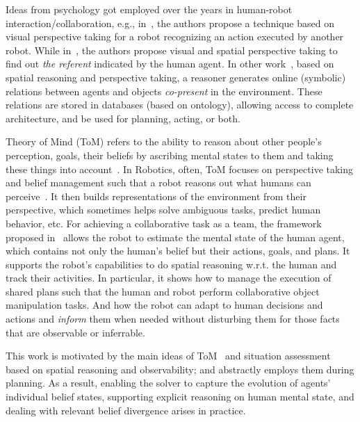 \documentclass[letterpaper]{article} %
\begin{document}
Ideas from psychology got employed over the years in human-robot interaction/collaboration, e.g., in~\cite{johnson2005perceptual}, the authors propose a technique based on visual perspective taking for a robot recognizing an action executed by another robot. 
While in~\cite{milliez2014framework}, the authors propose visual and spatial perspective taking to find out {\em the referent} indicated by the human agent. 
In other work~\cite{Sisbot2011SituationAF}, based on spatial reasoning and perspective taking, a reasoner generates online (symbolic) relations between agents and objects {\em co-present} in the environment. 
These relations are stored in databases (based on ontology), allowing access to complete architecture, and be used for planning, acting, or both.

Theory of Mind (ToM) refers to the ability to reason about other people's perception, goals, their beliefs by ascribing mental states to them and taking these things into account~\cite{premack1978does,baron1985does}.
In Robotics, often, ToM focuses on perspective taking and belief management such that a robot reasons out what humans can perceive~\cite{berlin2006perspective,milliez2014framework}.
It then builds representations of the environment from their perspective, which sometimes helps solve ambiguous tasks, predict human behavior, etc.
For achieving a collaborative task as a team, the framework proposed in~\cite{devin2016implemented} allows the robot to estimate the mental state of the human agent, which contains not only the human's belief but their actions, goals, and plans. It supports the robot's capabilities to do spatial reasoning w.r.t. the human and track their activities. In particular, it shows how to manage the execution of shared plans such that the human and robot perform collaborative object manipulation tasks. And how the robot can adapt to human decisions and actions and \textit{inform} them when needed without disturbing them for those facts that are observable or inferrable.     

This work is motivated by the main ideas of ToM~\cite{devin2016implemented} and situation assessment based on spatial reasoning and observability; and abstractly employs them during planning. 
As a result, enabling the solver to capture the evolution of agents' individual belief states, supporting explicit reasoning on human mental state, and dealing with relevant belief divergence arises in practice.

\end{document}
